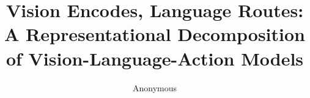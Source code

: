 \documentclass{article}
\title{Vision Encodes, Language Routes:\\ A Representational Decomposition of Vision-Language-Action Models}
\author{Anonymous}
\begin{document}
\maketitle

\begin{abstract}

\end{abstract}











\end{document}
